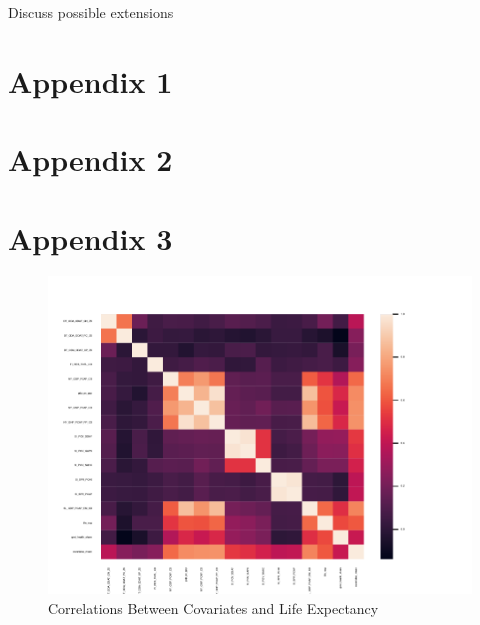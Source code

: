 \documentclass[12pt]{article}
\begin{document}
        Discuss possible extensions

    \clearpage \newpage

    \appendix

    \section*{Appendix 1}

        
        
        
    \section*{Appendix 2}


        
        
        


    \section*{Appendix 3}

        \begin{figure}[h!]
            \centering
            \caption{Correlations Between Covariates and Life Expectancy}
            \label{LE_Health_Econ_Correlations}	
            \includegraphics[width=\linewidth,keepaspectratio=true]{../Output/Figures/LE_Health_Econ_Correlations_combined.pdf}
        \end{figure}
\end{document}
